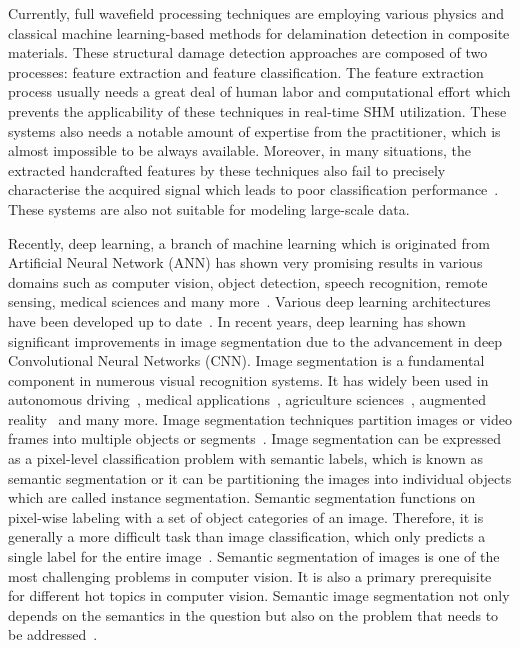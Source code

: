 Currently, full wavefield processing techniques are employing various physics and classical machine learning-based methods for delamination detection in composite materials. These structural damage detection approaches are composed of two processes: feature extraction and feature classification. The feature extraction process usually needs a great deal of human labor and computational effort which prevents the applicability of these techniques in real-time SHM utilization. These systems also needs a notable amount of expertise from the practitioner, which is almost impossible to be always available. Moreover, in many situations, the extracted handcrafted features by these techniques also fail to precisely characterise the acquired signal which leads to poor classification performance~\cite{zhao2019deep, yuan2020machine}. These systems are also not suitable for modeling large-scale data.

Recently, deep learning, a branch of machine learning which is originated from Artificial Neural Network (ANN) has shown very promising results in various domains such as computer vision, object detection, speech recognition, remote sensing, medical sciences and many more~\cite{deng2014deep, mohanty2016using, zhang2020well, pashaei2020review}. Various deep learning architectures have been developed up to date~\cite{zhao2019deep}. In recent years, deep learning has shown significant improvements in image segmentation due to the advancement in deep Convolutional Neural Networks (CNN). Image segmentation is a fundamental component in numerous visual recognition systems. It has widely been used in autonomous driving~\cite{zhang2013understanding, cordts2016cityscapes, ros2016synthia, li2018real}, medical applications~\cite{taghanaki2020deep}, agriculture sciences~\cite{milioto2018real}, augmented reality~\cite{miksik2015semantic} and many more. Image segmentation techniques partition images or video frames into multiple objects or segments~\cite{szeliski2010computer}. Image segmentation can be expressed as a pixel-level classification problem with semantic labels, which is known as semantic segmentation or it can be partitioning the images into individual objects which are called instance segmentation. Semantic segmentation functions on pixel-wise labeling with a set of object categories of an image. Therefore, it is generally a more difficult task than image classification, which only predicts a single label for the entire image~\cite{minaee2020image}. Semantic segmentation of images is one of the most challenging problems in computer vision. It is also a primary prerequisite for different hot topics in computer vision. Semantic image segmentation not only depends on the semantics in the question but also on the problem that needs to be addressed~\cite{ghosh2019understanding}.


